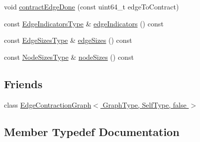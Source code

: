 \begin{DoxyCompactItemize}
void \hyperlink{classnifty_1_1graph_1_1agglo_1_1MinimumNodeSizeClusterPolicy_a112ebb5f7a1505f53fcc973e6139fff4}{contract\+Edge\+Done} (const uint64\+\_\+t edge\+To\+Contract)
\item 
const \hyperlink{classnifty_1_1graph_1_1agglo_1_1MinimumNodeSizeClusterPolicy_a81a0b54e4eadb98c9a125593b1c6e17c}{Edge\+Indicators\+Type} \& \hyperlink{classnifty_1_1graph_1_1agglo_1_1MinimumNodeSizeClusterPolicy_a1a03ddb9ab64483e30d5724fc9d79f26}{edge\+Indicators} () const
\item 
const \hyperlink{classnifty_1_1graph_1_1agglo_1_1MinimumNodeSizeClusterPolicy_a645ba7b5aabb0fd8cecad292041d929a}{Edge\+Sizes\+Type} \& \hyperlink{classnifty_1_1graph_1_1agglo_1_1MinimumNodeSizeClusterPolicy_a7ef42cbef0fd3e08678f7ec44324b6ad}{edge\+Sizes} () const
\item 
const \hyperlink{classnifty_1_1graph_1_1agglo_1_1MinimumNodeSizeClusterPolicy_a64f036ec68ecf74d84f9238f77957c1e}{Node\+Sizes\+Type} \& \hyperlink{classnifty_1_1graph_1_1agglo_1_1MinimumNodeSizeClusterPolicy_a8e39a8dead5de5d9ed19f597d6c792c2}{node\+Sizes} () const
\end{DoxyCompactItemize}
\subsection*{Friends}
\begin{DoxyCompactItemize}
\item 
class \hyperlink{classnifty_1_1graph_1_1agglo_1_1MinimumNodeSizeClusterPolicy_aca0e7e94ea239b3e26ea0173e356de7a}{Edge\+Contraction\+Graph$<$ Graph\+Type, Self\+Type, false $>$}
\end{DoxyCompactItemize}


\subsection{Member Typedef Documentation}
\mbox{\label{classnifty_1_1graph_1_1agglo_1_1MinimumNodeSizeClusterPolicy_a5c67401c61d1d283b73c3ce8a31faeb9}} 

